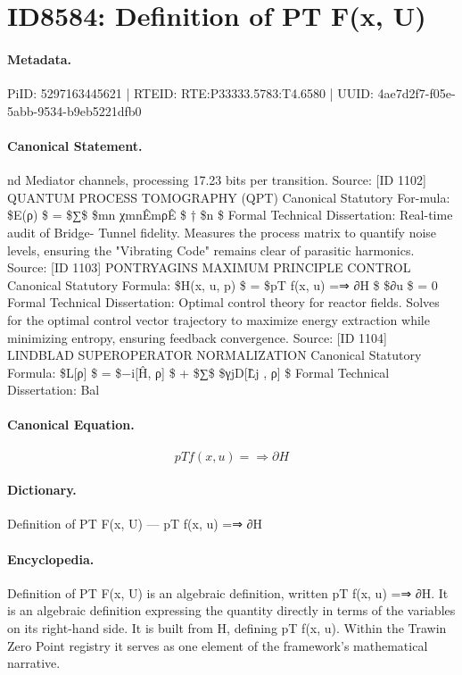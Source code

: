 \section*{ID8584: Definition of PT F(x, U)}
\paragraph{Metadata.}
PiID: 5297163445621 | RTEID: RTE:P33333.5783:T4.6580 | UUID: 4ae7d2f7-f05e-5abb-9534-b9eb5221dfb0

\paragraph{Canonical Statement.}
nd Mediator channels, processing 17.23 bits per transition. Source: [ID 1102] QUANTUM PROCESS TOMOGRAPHY (QPT) Canonical Statutory For-mula: \$E(ρ) \$ = \$∑\$ \$mn χmnÊmρÊ \$ † \$n \$ Formal Technical Dissertation: Real-time audit of Bridge- Tunnel fidelity. Measures the process matrix to quantify noise levels, ensuring the "Vibrating Code" remains clear of parasitic harmonics. Source: [ID 1103] PONTRYAGINS MAXIMUM PRINCIPLE CONTROL Canonical Statutory Formula: \$H(x, u, p) \$ = \$pT f(x, u) =⇒ ∂H \$ \$∂u \$ = 0 Formal Technical Dissertation: Optimal control theory for reactor fields. Solves for the optimal control vector trajectory to maximize energy extraction while minimizing entropy, ensuring feedback convergence. Source: [ID 1104] LINDBLAD SUPEROPERATOR NORMALIZATION Canonical Statutory Formula: \$L[ρ] \$ = \$−i[Ĥ, ρ] \$ + \$∑\$ \$γjD[L̂j , ρ] \$ Formal Technical Dissertation: Bal

\paragraph{Canonical Equation.}
\[
pT f(x, u) =⇒ ∂H
\]

\paragraph{Dictionary.}
Definition of PT F(x, U) — pT f(x, u) =⇒ ∂H

\paragraph{Encyclopedia.}
Definition of PT F(x, U) is an algebraic definition, written pT f(x, u) =⇒ ∂H. It is an algebraic definition expressing the quantity directly in terms of the variables on its right-hand side. It is built from H, defining pT f(x, u). Within the Trawin Zero Point registry it serves as one element of the framework's mathematical narrative.

